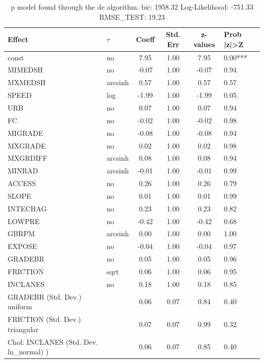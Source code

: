 \begin{table}
	\caption{p model found through the de algorithm. bic: 1958.32 Log-Likelihood: -751.33 RMSE_TEST: 19.23}
	\begin{center}
		\begin{tabular}{|l|l|c|c|c|l|}
			\hline
			Effect & $\tau$ & Coeff & Std. Err & z-values & Prob |z|>Z \\
			\hline
			const & no & 7.95 & 1.00 & 7.95 & 0.00*** \\
			\hline
			MIMEDSH & no & -0.07 & 1.00 & -0.07 & 0.94 \\
			\hline
			MXMEDSH & arcsinh & 0.57 & 1.00 & 0.57 & 0.57 \\
			\hline
			SPEED & log & -1.99 & 1.00 & -1.99 & 0.05. \\
			\hline
			URB & no & 0.07 & 1.00 & 0.07 & 0.94 \\
			\hline
			FC & no & -0.02 & 1.00 & -0.02 & 0.98 \\
			\hline
			MIGRADE & no & -0.08 & 1.00 & -0.08 & 0.94 \\
			\hline
			MXGRADE & no & 0.02 & 1.00 & 0.02 & 0.98 \\
			\hline
			MXGRDIFF & arcsinh & 0.08 & 1.00 & 0.08 & 0.94 \\
			\hline
			MINRAD & arcsinh & -0.01 & 1.00 & -0.01 & 0.99 \\
			\hline
			ACCESS & no & 0.26 & 1.00 & 0.26 & 0.79 \\
			\hline
			SLOPE & no & 0.01 & 1.00 & 0.01 & 0.99 \\
			\hline
			INTECHAG & no & 0.23 & 1.00 & 0.23 & 0.82 \\
			\hline
			LOWPRE & no & -0.42 & 1.00 & -0.42 & 0.68 \\
			\hline
			GBRPM & arcsinh & 0.00 & 1.00 & 0.00 & 1.00 \\
			\hline
			EXPOSE & no & -0.04 & 1.00 & -0.04 & 0.97 \\
			\hline
			GRADEBR & no & 0.05 & 1.00 & 0.05 & 0.96 \\
			\hline
			FRICTION & sqrt & 0.06 & 1.00 & 0.06 & 0.95 \\
			\hline
			INCLANES & no & 0.18 & 1.00 & 0.18 & 0.85 \\
			\hline
			GRADEBR (Std. Dev.) uniform &  & 0.06 & 0.07 & 0.84 & 0.40 \\
			\hline
			FRICTION (Std. Dev.) triangular &  & 0.07 & 0.07 & 0.99 & 0.32 \\
			\hline
			 Chol: INCLANES (Std. Dev. ln_normal) ) &  & 0.06 & 0.07 & 0.85 & 0.40 \\
			\hline
		\end{tabular}
	\end{center}
\end{table}